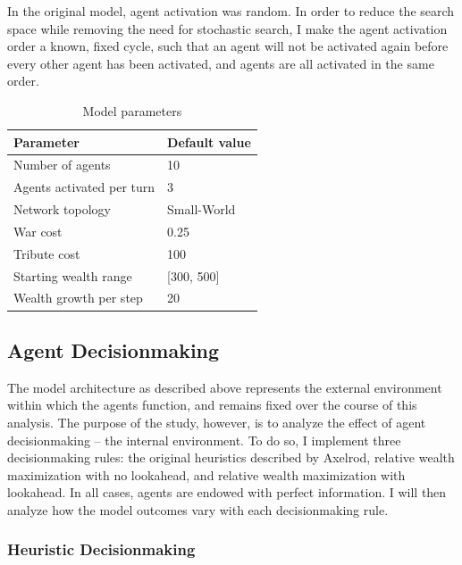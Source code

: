 \documentclass{article}
\begin{document}
In the original model, agent activation was random. In order to reduce the search space while removing the need for stochastic search, I make the agent activation order a known, fixed cycle, such that an agent will not be activated again before every other agent has been activated, and agents are all activated in the same order.

\begin{table}[h]
\begin{tabular}{@{}ll@{}}
\toprule
\textbf{Parameter}               & \textbf{Default value}                            \\ \midrule
Number of agents       & 10                                       \\
Agents activated per turn       & 3                                       \\
Network topology       & Small-World                              \\
War cost               & 0.25                                     \\
Tribute cost           & 100                                      \\
Starting wealth range        &  {[}300, 500{]} \\
Wealth growth per step & 20                                      \\ \bottomrule
\end{tabular}
\caption{Model parameters}
\end{table}

\subsection{Agent Decisionmaking}
The model architecture as described above represents the external environment within which the agents function, and remains fixed over the course of this analysis. The purpose of the study, however, is to analyze the effect of agent decisionmaking -- the internal environment. To do so, I implement three decisionmaking rules: the original heuristics described by Axelrod, relative wealth maximization with no lookahead, and relative wealth maximization with lookahead. In all cases, agents are endowed with perfect information.  I will then analyze how the model outcomes vary with each decisionmaking rule.

\subsubsection{Heuristic Decisionmaking}
\end{document}

